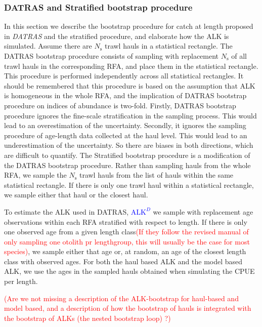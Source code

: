 \documentclass[a4paper 12pt]{article}
\numberwithin{equation}{section}
\newcommand{\ed}[1]{\textcolor{red}{#1}}
\newcommand{\nat}[1]{\textcolor{blue}{#1}}
\begin{document}
{\subsubsection{DATRAS and Stratified bootstrap procedure}
\label{sec:datrasstratifiedbootstrap}
In this section we describe the bootstrap procedure for catch at length proposed in \emph{DATRAS} \nat{\citet{ICES2006Report}} and the stratified procedure, and elaborate how the ALK is simulated. Assume there are $N_{\text{s}}$ trawl hauls in a statistical rectangle. The DATRAS bootstrap procedure consists of sampling with replacement $N_{\text{s}}$ of all trawl hauls in the corresponding RFA, and place them in the statistical rectangle. This procedure is performed independently across all statistical rectangles. It should be remembered that this procedure is based on the assumption that ALK is homogeneous in the whole RFA, and the implication of DATRAS bootstrap procedure on indices of abundance is two-fold. Firstly, DATRAS bootstrap procedure ignores the fine-scale stratification in the sampling process. This would lead to an overestimation of the uncertainty. Secondly, it ignores the sampling procedure of age-length data collected at the haul level. This would lead  to an underestimation of the uncertainty. So there are biases in both directions, which are difficult to quantify. The Stratified bootstrap procedure is a modification of the DATRAS bootstrap procedure. Rather than sampling hauls from the whole RFA, we  sample the $N_{\text{s}}$ trawl hauls from the list of hauls within the same statistical rectangle. If there is only one trawl haul within a statistical rectangle, we sample either that haul or the closest haul.

To estimate the ALK used in DATRAS,  \nat{$\mathrm{ALK}^{D}$} we sample with replacement age observations within each RFA stratified with respect to length. If there is only one observed age from a given length class\ed{(If they follow the revised manual of only sampling one otolith pr lengthgroup, this will usually be the case for most species)}, we sample either that age or, at random, an age of the closest length class with observed ages. For both the haul based ALK and the model based ALK, we use the ages in the sampled hauls obtained when simulating the CPUE per length.

\ed{(Are we not missing a description of the ALK-bootstrap for haul-based and model based, and a description of how the bootstrap of hauls is integrated with the bootstrap of ALKs (the nested bootstrap loop) ?)} 

}
\end{document}
